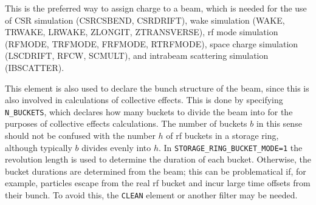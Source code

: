 This is the preferred way to assign charge to a beam, which is needed for the use of CSR simulation (CSRCSBEND, CSRDRIFT),
wake simulation (WAKE, TRWAKE, LRWAKE, ZLONGIT, ZTRANSVERSE), rf mode simulation (RFMODE, TRFMODE, FRFMODE, RTRFMODE),
space charge simulation (LSCDRIFT, RFCW, SCMULT), and intrabeam scattering simulation (IBSCATTER).

This element is also used to declare the bunch structure of the beam, since this is also involved in calculations of
collective effects. This is done by specifying \verb|N_BUCKETS|, which declares how many buckets to divide the beam into for
the purposes of collective effects calculations. The number of buckets $b$ in this sense should not be confused with the number $h$ of rf buckets in a
storage ring, although typically $b$ divides evenly into $h$.
In \verb|STORAGE_RING_BUCKET_MODE=1| the revolution length is used to determine the
duration of each bucket. Otherwise, the bucket durations are determined from the beam; this can be problematical if,
for example, particles escape from the real rf bucket and incur large time offsets from their bunch. To avoid this, the \verb|CLEAN|
element or another filter may be needed.
